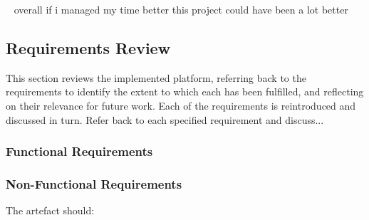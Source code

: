 ~ overall if i managed my time better this project could have been a lot better

\subsection{Requirements Review} \label{s-i--requirements-review}

This section reviews the implemented platform, referring back to the requirements to identify the extent to which each has been fulfilled, and reflecting on their relevance for future work. Each of the requirements is reintroduced and discussed in turn.
Refer back to each specified requirement and discuss...


\subsubsection{Functional Requirements} \label{s-i--requirements--functional}

\subsubsection{Non-Functional Requirements} \label{s-i--requirements--non-functional}

The artefact should:

